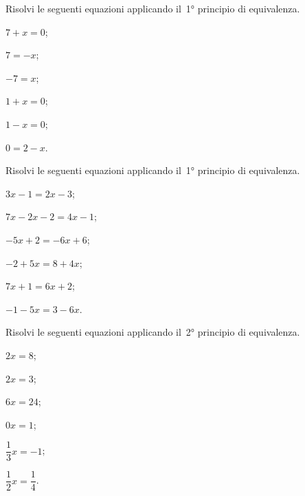 \begin{esercizio}
\label{ese:15.4}
Risolvi le seguenti equazioni applicando il~1° principio di equivalenza.
\begin{multicols}{3}
\begin{enumeratea}
\spazielenx
 \item $7+x=0$;
 \item $7=-x$;
 \item $-7=x$;
 \item $1+x=0$;
 \item $1-x=0$;
 \item $0=2-x$.
\end{enumeratea}
\end{multicols}
\end{esercizio}

\begin{esercizio}
\label{ese:15.5}
Risolvi le seguenti equazioni applicando il~1° principio di equivalenza.
\begin{multicols}{3}
\begin{enumeratea}
\spazielenx
 \item $3x-1=2x-3$;
 \item $7x-2x-2=4x-1$;
 \item $-5x+2=-6x+6$;
 \item $-2+5x=8+4x$;
 \item $7x+1=6x+2$;
 \item $-1-5x=3-6x$.
\end{enumeratea}
\end{multicols}
\end{esercizio}

\begin{esercizio}
\label{ese:15.6}
Risolvi le seguenti equazioni applicando il~2° principio di equivalenza.
\begin{multicols}{3}
\begin{enumeratea}
\spazielenx
 \item $2x=8$;
 \item $2x=3$;
 \item $6x=24$;
 \item $0x=1$;
 \item $\dfrac{1}{3}x=-1$;
 \item $\dfrac{1}{2}x=\dfrac{1}{4}$.
\end{enumeratea}
\end{multicols}
\end{esercizio}


